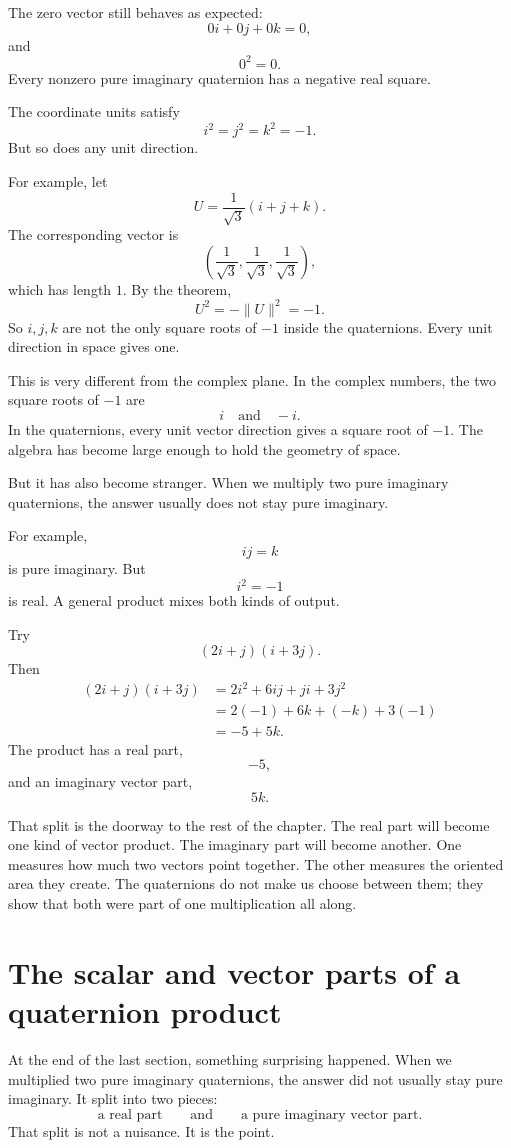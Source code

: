 The zero vector still behaves as expected:
\[
    0i+0j+0k=0,
\]
and
\[
    0^2=0.
\]
Every nonzero pure imaginary quaternion has a negative real square.

\begin{example}
The coordinate units satisfy
\[
    i^2=j^2=k^2=-1.
\]
But so does any unit direction.

For example, let
\[
    U=\frac{1}{\sqrt3}(i+j+k).
\]
The corresponding vector is
\[
    \left(\frac1{\sqrt3},\frac1{\sqrt3},\frac1{\sqrt3}\right),
\]
which has length \(1\).  By the theorem,
\[
    U^2=-\|U\|^2=-1.
\]
So \(i,j,k\) are not the only square roots of \(-1\) inside the quaternions.  Every unit
direction in space gives one.
\end{example}

This is very different from the complex plane.  In the complex numbers, the two square
roots of \(-1\) are
\[
    i \quad\text{and}\quad -i.
\]
In the quaternions, every unit vector direction gives a square root of \(-1\).  The algebra
has become large enough to hold the geometry of space.

But it has also become stranger.  When we multiply two pure imaginary quaternions, the
answer usually does not stay pure imaginary.

For example,
\[
    ij=k
\]
is pure imaginary.  But
\[
    i^2=-1
\]
is real.  A general product mixes both kinds of output.

Try
\[
    (2i+j)(i+3j).
\]
Then
\[
\begin{aligned}
    (2i+j)(i+3j)
    &=
    2i^2+6ij+ji+3j^2\\
    &=
    2(-1)+6k+(-k)+3(-1)\\
    &=
    -5+5k.
\end{aligned}
\]
The product has a real part,
\[
    -5,
\]
and an imaginary vector part,
\[
    5k.
\]

That split is the doorway to the rest of the chapter.  The real part will become one
kind of vector product.  The imaginary part will become another.  One measures how
much two vectors point together.  The other measures the oriented area they create.
The quaternions do not make us choose between them; they show that both were part of
one multiplication all along.
\section{The scalar and vector parts of a quaternion product}

At the end of the last section, something surprising happened.  When we multiplied two
pure imaginary quaternions, the answer did not usually stay pure imaginary.  It split
into two pieces:
\[
    \text{a real part}
    \qquad\text{and}\qquad
    \text{a pure imaginary vector part}.
\]
That split is not a nuisance.  It is the point.

